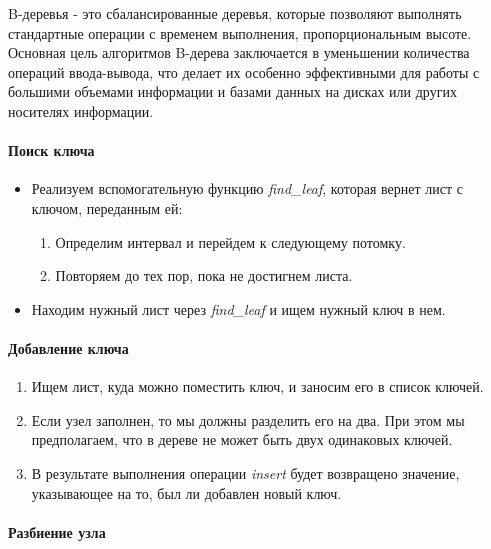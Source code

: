 \documentclass[14pt, russian]{scrartcl}
\begin{document}
B-деревья - это сбалансированные деревья, которые позволяют выполнять стандартные операции с временем выполнения, пропорциональным высоте. Основная цель алгоритмов B-дерева заключается в уменьшении количества операций ввода-вывода, что делает их особенно эффективными для работы с большими объемами информации и базами данных на дисках или других носителях информации.

\paragraph{Поиск ключа}

\begin{itemize}
\item Реализуем вспомогательную функцию \textit{find\_leaf}, которая вернет лист с ключом, переданным ей:
    \begin{enumerate}
    \item Определим интервал и перейдем к следующему потомку.
    \item Повторяем до тех пор, пока не достигнем листа.
    \end{enumerate}
\item Находим нужный лист через \textit{find\_leaf} и ищем нужный ключ в нем.
\end{itemize}

\paragraph{Добавление ключа}

\begin{enumerate}
\item Ищем лист, куда можно поместить ключ, и заносим его в список ключей.
\item Если узел заполнен, то мы должны разделить его на два. При этом мы предполагаем, что в дереве не может быть двух одинаковых ключей.
\item В результате выполнения операции \textit{insert} будет возвращено значение, указывающее на то, был ли добавлен новый ключ.
\end{enumerate}

\paragraph{Разбиение узла}
\end{document}
